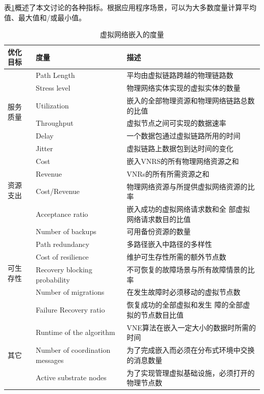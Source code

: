 表\ref{tab:MetricsForVirtualNetworkEmbedding}概述了本文讨论的各种指标。根据应用程序场景，可以为大多数度量计算平均值、最大值和/或最小值。
\begin{table}[hbtp]
\caption{虚拟网络嵌入的度量}\label{tab:MetricsForVirtualNetworkEmbedding}
\vspace{0.5em}\centering\wuhao
\begin{tabular}{lll}
\toprule[1.5pt]
优化目标  & 度量   & 描述  \\
\midrule[1pt]
\multirow{6}{*}{服务质量} & Path Length  & 平均由虚拟链路跨越的物理链路数\\
 & Stress level  & 物理网络实体实现的虚拟实体的数量\\
 & Utilization & 嵌入的全部物理资源和物理网络链路总数的比值\\
 & Throughput & 虚拟节点之间可实现的数据速率\\
 & Delay  & 一个数据包通过虚拟链路所用的时间
\\
 & Jitter  & 虚拟链路上数据包到达时间的变化\\
\hline
\multirow{4}{*}{资源支出} & Cost  & 嵌入VNRS的所有物理网络资源之和\\
 & Revenue  & VNRs的所有所需资源之和\\
 & Cost/Revenue & 物理网络资源与所提供虚拟网络资源的比率\\
 & Acceptance ratio & 嵌入成功的虚拟网络请求数和全 部虚拟网络请求数目的比值\\
\hline
\multirow{6}{*}{可生存性} & Number of backups  &可用备份资源的数量\\
 & Path redundancy  & 多路径嵌入中路径的多样性\\
 & Cost of resilience & 维护可生存性所需的额外节点数\\
 & Recovery blocking probability & 不可恢复的故障场景与所有故障情景的比率\\
 & Number of migrations  & 在发生故障时必须移动的虚拟节点数\\
 & Failure Recovery ratio  & 恢复成功的全部虚拟和发生 障的全部虚拟的节点数目比值\\
\hline
\multirow{3}{*}{其它} & Runtime of the algorithm  & VNE算法在嵌入一定大小的数据时所需的时间\\
 & Number of coordination messages  & 为了完成嵌入而必须在分布式环境中交换的消息数量\\
 & Active substrate nodes & 为了实现管理虚拟基础设施，必须打开的物理节点数\\
\bottomrule[1.5pt]
\end{tabular}
\vspace{\baselineskip}
\end{table}

